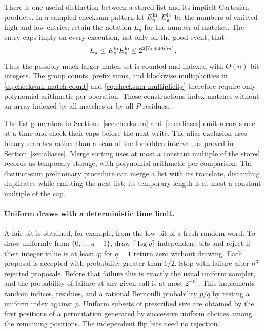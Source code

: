 There is one useful distinction between a stored list and its implicit
Cartesian products.  In a sampled checksum pattern let
$E_\pi^{\rm hi},E_\pi^{\rm lo}$ be the numbers of emitted high and low
entries; retain the notation $L_\pi$ for the number of matches.  The entry
caps imply on every execution, not only on the good event, that
\begin{equation}
 L_\pi\le E_\pi^{\rm hi}E_\pi^{\rm lo}
 \le 2^{2\lceil(\tau+20\epsilon)n\rceil}.
 \label{eq:implicit-match-bitlength}
\end{equation}
Thus the possibly much larger match set is counted and indexed with
$O(n)$-bit integers.  The group counts, prefix sums, and blockwise
multiplicities in \eqref{eq:checksum-match-count} and
\eqref{eq:checksum-multiplicity} therefore require only polynomial
arithmetic per operation.  Those constructions index matches without
an array indexed by all matches or by all $P$ residues.

The list generators in Sections~\ref{sec:checksum} and~\ref{sec:aliases}
emit records one at a time and check their caps before the next write.
The alias exclusion uses binary searches rather than a scan of the
forbidden interval, as proved in Section~\ref{sec:aliases}.
Merge sorting uses at most a constant multiple of the stored records as
temporary storage, with polynomial arithmetic per comparison.
The distinct-sum preliminary procedure
can merge a list with its translate, discarding duplicates while emitting
the next list; its temporary length is at most a constant multiple of the
cap.

\paragraph{Uniform draws with a deterministic time limit.}
A fair bit is obtained, for example, from the low bit of a fresh random
word.  To draw uniformly from $\{0,\ldots,q-1\}$, draw
$\lceil\log q\rceil$ independent bits and reject if their integer value
is at least $q$; for $q=1$ return zero without drawing.  Each proposal is
accepted with probability greater than $1/2$.  Stop with failure after
$n^3$ rejected proposals.  Before that failure this is exactly the usual
uniform sampler, and the probability of failure at any given call is at
most $2^{-n^3}$.  This implements random indices, residues, and a rational
Bernoulli probability $p/q$ by testing a uniform index against $p$.
Uniform subsets of prescribed size are obtained by the first positions
of a permutation generated by successive uniform choices among the
remaining positions.  The independent flip bits need no rejection.

